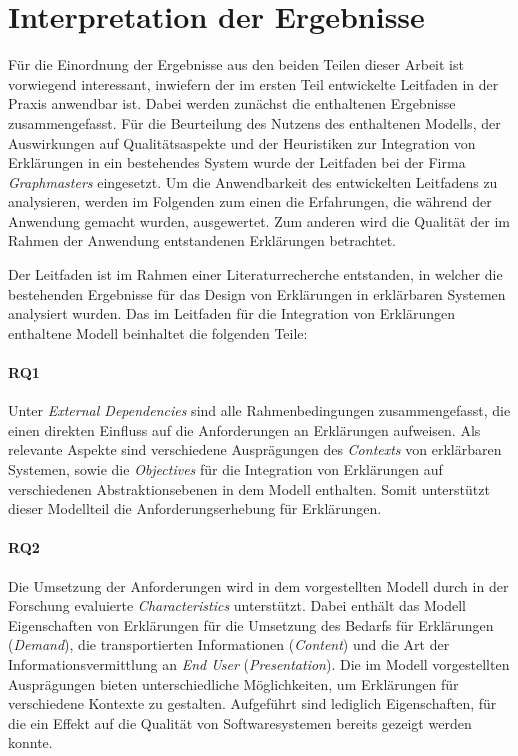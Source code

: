 \section{Interpretation der Ergebnisse}

Für die Einordnung der Ergebnisse aus den beiden Teilen dieser Arbeit ist vorwiegend interessant, inwiefern der im ersten Teil entwickelte Leitfaden in der Praxis anwendbar ist. Dabei werden zunächst die enthaltenen Ergebnisse zusammengefasst. Für die Beurteilung des Nutzens des enthaltenen Modells, der Auswirkungen auf Qualitätsaspekte und der Heuristiken zur Integration von Erklärungen in ein bestehendes System wurde der Leitfaden bei der Firma \textit{Graphmasters} eingesetzt. Um die Anwendbarkeit des entwickelten Leitfadens zu analysieren, werden im Folgenden zum einen die Erfahrungen, die während der Anwendung gemacht wurden, ausgewertet. Zum anderen wird die Qualität der im Rahmen der Anwendung entstandenen Erklärungen betrachtet.

Der Leitfaden ist im Rahmen einer Literaturrecherche entstanden, in welcher die bestehenden Ergebnisse für das Design von Erklärungen in erklärbaren Systemen analysiert wurden. Das im Leitfaden für die Integration von Erklärungen enthaltene Modell beinhaltet die folgenden Teile:

\paragraph{RQ1} Unter \textit{External Dependencies} sind alle Rahmenbedingungen zusammengefasst, die einen direkten Einfluss auf die Anforderungen an Erklärungen aufweisen. Als relevante Aspekte sind verschiedene Ausprägungen des \textit{Contexts} von erklärbaren Systemen, sowie die \textit{Objectives} für die Integration von Erklärungen auf verschiedenen Abstraktionsebenen in dem Modell enthalten. Somit unterstützt dieser Modellteil die Anforderungserhebung für Erklärungen.

\paragraph{RQ2} Die Umsetzung der Anforderungen wird in dem vorgestellten Modell durch in der Forschung evaluierte \textit{Characteristics} unterstützt. Dabei enthält das Modell Eigenschaften von Erklärungen für die Umsetzung des Bedarfs für Erklärungen (\textit{Demand}), die transportierten Informationen (\textit{Content}) und die Art der Informationsvermittlung an \textit{End User} (\textit{Presentation}). Die im Modell vorgestellten Ausprägungen bieten unterschiedliche Möglichkeiten, um Erklärungen für verschiedene Kontexte zu gestalten. Aufgeführt sind lediglich Eigenschaften, für die ein Effekt auf die Qualität von Softwaresystemen bereits gezeigt werden konnte.

